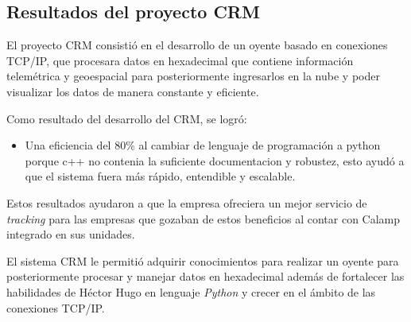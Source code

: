 \documentclass[protocolo.tex]{subfiles}
\begin{document}
\subsection{Resultados del proyecto CRM}

El proyecto CRM consistió en el desarrollo de un oyente basado en conexiones TCP/IP, que procesara datos en hexadecimal que contiene información telemétrica y geoespacial para posteriormente ingresarlos en la nube y poder visualizar los datos de manera constante y eficiente. \vspace{4mm}

Como resultado del desarrollo del CRM, se logró:

\begin{itemize}
    \item Una eficiencia del 80\% al cambiar de lenguaje de programación a python porque c++ no contenia la suficiente documentacion y robustez, esto ayudó a que el sistema fuera más rápido, entendible y escalable.
\end{itemize}

Estos resultados ayudaron a que la empresa ofreciera un mejor servicio de \textit{tracking} para las empresas que gozaban de estos beneficios al contar con Calamp integrado en sus unidades. \vspace{4mm}

El sistema CRM le permitió adquirir conocimientos para realizar un oyente para posteriormente procesar y manejar datos en hexadecimal además de fortalecer las habilidades de Héctor Hugo en lenguaje \textit{Python} y crecer en el ámbito de las conexiones TCP/IP.
\end{document}
